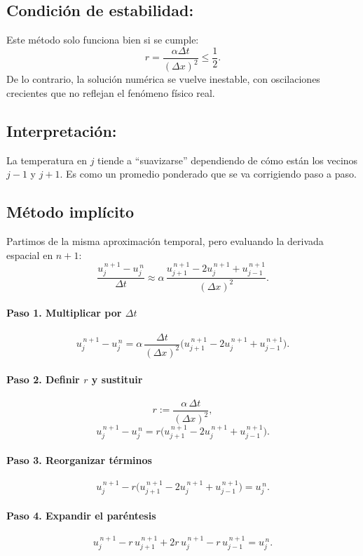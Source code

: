\documentclass[12pt,a4paper]{article}
\begin{document}
\subsection*{Condición de estabilidad:}
Este método solo funciona bien si se cumple:
\[
r = \frac{\alpha \Delta t}{(\Delta x)^2} \leq \frac{1}{2}.
\]
De lo contrario, la solución numérica se vuelve inestable, con oscilaciones crecientes que no reflejan el fenómeno físico real.

\subsection*{Interpretación:}
La temperatura en $j$ tiende a ``suavizarse'' dependiendo de cómo están los vecinos $j-1$ y $j+1$. Es como un promedio ponderado que se va corrigiendo paso a paso.

\subsection{Método implícito}

Partimos de la misma aproximación temporal, pero evaluando la derivada espacial en $n+1$:
\[
\frac{u_j^{\,n+1}-u_j^{\,n}}{\Delta t}
\approx
\alpha\,\frac{u_{j+1}^{\,n+1}-2u_j^{\,n+1}+u_{j-1}^{\,n+1}}{(\Delta x)^2}.
\]

\paragraph{Paso 1. Multiplicar por $\Delta t$}  
\[
u_j^{\,n+1}-u_j^{\,n}
= \alpha\,\frac{\Delta t}{(\Delta x)^2}\big(u_{j+1}^{\,n+1}-2u_j^{\,n+1}+u_{j-1}^{\,n+1}\big).
\]

\paragraph{Paso 2. Definir $r$ y sustituir}  
\[
r := \frac{\alpha\,\Delta t}{(\Delta x)^2},
\]
\[
u_j^{\,n+1}-u_j^{\,n} = r\big(u_{j+1}^{\,n+1}-2u_j^{\,n+1}+u_{j-1}^{\,n+1}\big).
\]

\paragraph{Paso 3. Reorganizar términos}  
\[
u_j^{\,n+1} - r\big(u_{j+1}^{\,n+1}-2u_j^{\,n+1}+u_{j-1}^{\,n+1}\big) = u_j^{\,n}.
\]

\paragraph{Paso 4. Expandir el paréntesis}  
\[
u_j^{\,n+1} - r\,u_{j+1}^{\,n+1} + 2r\,u_j^{\,n+1} - r\,u_{j-1}^{\,n+1} = u_j^{\,n}.
\]
\end{document}
